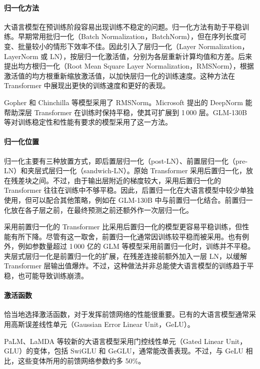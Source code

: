 \paragraph{归一化方法}
大语言模型在预训练阶段容易出现训练不稳定的问题。归一化方法有助于平稳训练。早期常用批归一化（Batch Normalization，BatchNorm），但在序列长度可变、批量较小的情形下效率不佳。因此引入了层归一化（Layer Normalization，LayerNorm 或 LN），按层归一化激活值，分别为各层重新计算均值和方差。后来提出均方根归一化（Root Mean Square Layer Normalization，RMSNorm），根据激活值的均方根重新缩放激活值，以加快层归一化的训练速度。这种方法在 Transformer 中展现出更快的训练速度和更好的表现。

\begin{practicaltip}
Gopher 和 Chinchilla 等模型采用了 RMSNorm。Microsoft 提出的 DeepNorm 能帮助深层 Transformer 在训练时保持平稳，使其可扩展到 1\,000 层。GLM-130B 等对训练稳定性和性能有要求的模型采用了这一方法。
\end{practicaltip}

\paragraph{归一化位置}
归一化主要有三种放置方式，即后置层归一化（post-LN）、前置层归一化（pre-LN）和夹层式层归一化（sandwich-LN）。原始 Transformer 采用后置归一化，放在残差块之间。不过，由于输出层附近的梯度较大，采用后置归一化的 Transformer 往往在训练中不够平稳。因此，后置归一化在大语言模型中较少单独使用，但可以配合其他策略，例如在 GLM-130B 中与前置归一化结合。前置归一化放在各子层之前，在最终预测之前还额外作一次层归一化。

\begin{practicaltip}
采用前置归一化的 Transformer 比采用后置归一化的模型更容易平稳训练，但性能有所下降。尽管有这一取舍，前置归一化通常因训练较平稳而被采用。也有例外，例如参数量超过 1\,000 亿的 GLM 等模型采用前置归一化时，训练并不平稳。夹层式层归一化是前置归一化的扩展，在残差连接前额外加入一层 LN，以缓解 Transformer 层输出值爆炸。不过，这种做法并非总能使大语言模型的训练趋于平稳，也可能导致训练崩溃。
\end{practicaltip}

\paragraph{激活函数}
恰当地选择激活函数，对于发挥前馈网络的性能很重要。已有的大语言模型通常采用高斯误差线性单元（Gaussian Error Linear Unit，GeLU）。

\begin{practicaltip}
PaLM、LaMDA 等较新的大语言模型采用门控线性单元（Gated Linear Unit，GLU）的变体，包括 SwiGLU 和 GeGLU，通常能改善表现。不过，与 GeLU 相比，这些变体所用的前馈网络参数约多 50\%。
\end{practicaltip}

